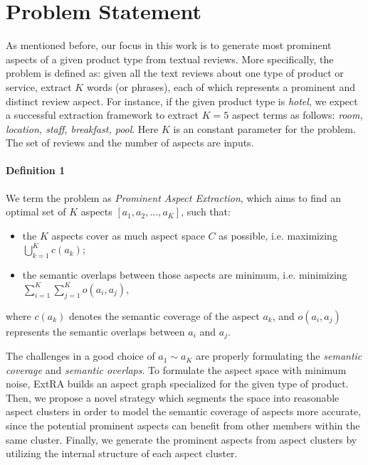 \section{Problem Statement}
\label{sec:problem}
As mentioned before, our focus in this work is to
generate most prominent aspects of a given product type
from textual reviews.
More specifically, the problem is defined as:
given all the text reviews about
one type of product or service, extract $K$ words (or phrases),
each of which represents a prominent and distinct review aspect.
For instance, if the given product type is \textit{hotel}, 
we expect a successful extraction framework to extract 
$K=5$ aspect terms as follows: 
\textit{room, location, staff, breakfast, pool}.
Here $K$ is an constant parameter for the problem. 
The set of reviews and the number of aspects are inputs.


\paragraph{Definition 1}
We term the problem as \textit{Prominent Aspect Extraction},
which aims to find 
an optimal set of $K$ aspects $[a_1, a_2, ..., a_K]$, such that:
\begin{itemize}
	\item  the $K$ aspects cover as much aspect space $C$ as possible,
	i.e. maximizing $\bigcup_{k=1}^K c(a_k)$;
	\item the semantic overlaps between those aspects are minimum, 
	i.e. minimizing $\sum_{i=1}^{K}\sum_{j=1}^{K}o(a_i, a_j)$,
\end{itemize}
where $c(a_k)$ denotes the semantic coverage of the aspect $a_k$,
and $o(a_i, a_j)$ represents the semantic overlaps between 
$a_i$ and $a_j$.

The challenges in a good choice of $a_1\sim a_K$ are properly
formulating the \textit{semantic coverage} and \textit{semantic overlaps}.
To formulate the aspect space with minimum noise, 
ExtRA builds an aspect graph specialized for the given type of product.
Then, we propose a novel strategy which segments the space into reasonable aspect clusters in order to model the semantic coverage of
aspects more accurate, since the potential prominent aspects can benefit from other members within the same cluster.
Finally, we generate the prominent aspects from aspect clusters
by utilizing the internal structure of each aspect cluster.

